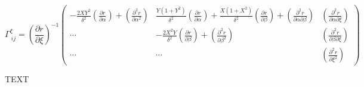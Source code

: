 \documentclass[gmdd, hvmath, online]{copernicus_discussions}
\newcommand{\pdiff}[2]{\frac{\partial #1}{\partial #2}}
\begin{document}
\begin{equation}
\Gamma^{\xi}_{\ i j} = \left( \pdiff{r}{\xi} \right)^{-1} \left( \begin{array}{ccc} \displaystyle - \frac{2 X Y^2}{\delta^2} \left( \pdiff{r}{\alpha} \right) + \left( \frac{\partial^2 r}{\partial \alpha^2} \right) & \displaystyle \frac{Y (1+Y^2)}{\delta^2} \left( \pdiff{r}{\alpha} \right) + \frac{X (1+X^2)}{\delta^2} \left( \pdiff{r}{\beta} \right) + \left( \frac{\partial^2 r}{\partial \alpha \partial \beta} \right) & \displaystyle \left( \frac{\partial^2 r}{\partial \alpha \partial \xi} \right) \\[4.0ex] \cdots & \displaystyle - \frac{2 X^2 Y}{\delta^2} \left( \pdiff{r}{\beta} \right) + \left( \frac{\partial^2 r}{\partial \beta^2} \right) & \displaystyle \left( \frac{\partial^2 r}{\partial \beta \partial \xi} \right) \\[4.0ex] \cdots & \cdots & \displaystyle \left( \frac{\partial^2 r}{\partial \xi^2} \right)  \end{array} \right)
\end{equation}






\begin{acknowledgements}
TEXT
\end{acknowledgements}




\end{document}

